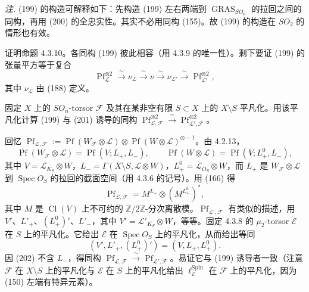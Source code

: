 \emph{注.} (199) 的构造可解释如下：先构造 (199) 左右两端到 $\operatorname{GRAS}_{SO_{n}}$ 的拉回之间的同构，再用 (200) 的全忠实性。其实不必用同构 (155)。故 (199) 的构造在 $SO_{2}$ 的情形也有效。

 证明命题 4.3.10。各同构 (199) 彼此相容（用 4.3.9 的唯一性）。剩下要证 (199) 的张量平方等于复合
\begin{equation}\tag{201}
\operatorname{Pf}_{\mathcal{L}}^{\otimes 2}\xrightarrow{\ \sim\ }\nu_{\mathcal{L}}\xrightarrow{\ \sim\ }\nu\xrightarrow{\ \sim\ }\nu_{\mathcal{L}'}\xrightarrow{\ \sim\ }\operatorname{Pf}_{\mathcal{L}'}^{\otimes 2},
\end{equation}
其中 $\nu_{\mathcal{L}}$ 由 (188) 定义。

固定 $X$ 上的 $SO_{n}$-torsor $\mathcal{F}$ 及其在某非空有限 $S\subset X$ 上的 $X\setminus S$ 平凡化。用该平凡化计算 (199) 与 (201) 诱导的同构 $\operatorname{Pf}_{\mathcal{L},\mathcal{F}}^{\otimes 2}\xrightarrow{\ \sim\ }\operatorname{Pf}_{\mathcal{L}',\mathcal{F}}^{\otimes 2}$。

回忆 $\operatorname{Pf}_{\mathcal{L},\mathcal{F}}:=\operatorname{Pf}(W_{\mathcal{F}}\otimes\mathcal{L})\otimes\operatorname{Pf}(W\otimes\mathcal{L})^{\otimes-1}$。由 4.2.13，
\[
\operatorname{Pf}(W_{\mathcal{F}}\otimes\mathcal{L})=\operatorname{Pf}(V;L_{+},L_{-}),\qquad
\operatorname{Pf}(W\otimes\mathcal{L})=\operatorname{Pf}(V;L_{+}^{0},L_{-}),
\]
其中 $V=\mathcal{L}_{K_{S}}\otimes W$，$L_{-}=\Gamma(X\setminus S,\mathcal{L}\otimes W)$，$L_{+}^{0}=\mathcal{L}_{O_{S}}\otimes W$，而 $L_{+}$ 是 $W_{\mathcal{F}}\otimes\mathcal{L}$ 到 $\operatorname{Spec} O_{S}$ 的拉回的截面空间（用 4.3.6 的记号）。用 (166) 得
\begin{equation}\tag{202}
\operatorname{Pf}_{\mathcal{L},\mathcal{F}}=M^{L_{+}}\otimes(M^{L_{+}^{0}})^{*},
\end{equation}
其中 $M$ 是 $\operatorname{Cl}(V)$ 上不可约的 $\mathbb{Z}/2\mathbb{Z}$-分次离散模。$\operatorname{Pf}_{\mathcal{L}',\mathcal{F}}$ 有类似的描述，用 $V'$、$L'_{+}$、$(L_{+}^{0})'$、$L'_{-}$，其中 $V'=\mathcal{L}'_{K_{S}}\otimes W$，等等。固定 4.3.8 的 $\mu_{2}$-torsor $\mathcal{E}$ 在 $S$ 上的平凡化。它给出 $\mathcal{E}$ 在 $\operatorname{Spec} O_{S}$ 上的平凡化，从而给出等同
\begin{equation}\tag{203}
(V',L'_{+},(L_{+}^{0})')=(V,L_{+},L_{+}^{0}).
\end{equation}
因 (202) 不含 $L_{-}$，得同构 $\operatorname{Pf}_{\mathcal{L},\mathcal{F}}\xrightarrow{\ \sim\ }\operatorname{Pf}_{\mathcal{L}',\mathcal{F}}$。易证它与 (199) 诱导者一致（注意 $\mathcal{F}$ 在 $X\setminus S$ 上的平凡化与 $\mathcal{E}$ 在 $S$ 上的平凡化给出 $\ell^{\operatorname{Spin}}_{\mathcal{E}}$ 在 $\mathcal{F}$ 上的平凡化，因为 (150) 左端有特异元素）。

